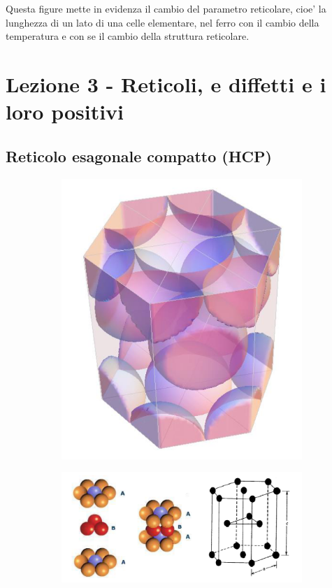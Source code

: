 \documentclass{article}
\begin{document}
            Questa figure mette in evidenza il cambio del parametro reticolare, cioe' la lunghezza di un lato di una celle elementare, nel ferro 
            con il cambio della temperatura e con se il cambio della struttura reticolare.
    \newpage
    \section{Lezione 3 - Reticoli, e diffetti e i loro positivi}    
        \subsection{Reticolo esagonale compatto (HCP)}
            \begin{figure}[ht!]
                \centering
                \begin{subfigure}{.25\linewidth}
                    \includegraphics[width=\linewidth]{HCP grafico.png}
                \end{subfigure}
                \begin{subfigure}{.65\linewidth}
                    \includegraphics[width=\linewidth]{HCP schematica.png}
                \end{subfigure}
            \end{figure}
\end{document}
